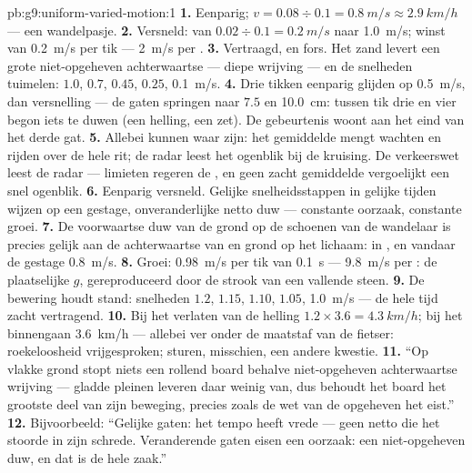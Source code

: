 \begin{solution}{pb:g9:uniform-varied-motion:1}
\textbf{1.} Eenparig; $v = 0.08 \div 0.1 = \qty{0.8}{m/s} \approx
\qty{2.9}{km/h}$ --- een wandelpasje.
\textbf{2.} Versneld: van $0.02 \div 0.1 = \qty{0.2}{m/s}$ naar
\qty{1.0}{m/s}; winst van \qty{0.2}{m/s} per tik --- \qty{2}{m/s} per
.
\textbf{3.} Vertraagd, en fors. Het zand levert een grote
niet-opgeheven achterwaartse  --- diepe wrijving --- en de
snelheden tuimelen: $1.0$, $0.7$, $0.45$, $0.25$,
\qty{0.1}{m/s}.
\textbf{4.} Drie tikken eenparig glijden op \qty{0.5}{m/s}, dan
versnelling --- de gaten springen naar $7.5$ en \qty{10.0}{cm}: tussen
tik drie en vier begon iets te duwen (een helling, een zet). De
gebeurtenis woont aan het eind van het derde gat.
\textbf{5.} Allebei kunnen waar zijn: het gemiddelde mengt wachten en
rijden over de hele rit; de radar leest het ogenblik bij de kruising. De
verkeerswet leest de radar --- limieten regeren de
, en geen zacht gemiddelde vergoelijkt een snel
ogenblik.
\textbf{6.} Eenparig versneld. Gelijke snelheidsstappen in gelijke
tijden wijzen op een gestage, onveranderlijke netto duw --- constante
oorzaak, constante groei.
\textbf{7.} De voorwaartse duw van de grond op de schoenen van de
wandelaar is precies gelijk aan de achterwaartse  van
 en grond op het lichaam: in , en vandaar de
gestage \qty{0.8}{m/s}.
\textbf{8.} Groei: \qty{0.98}{m/s} per tik van \qty{0.1}{s} ---
\qty{9.8}{m/s} per : de plaatselijke $g$, gereproduceerd door de
strook van een vallende steen.
\textbf{9.} De bewering houdt stand: snelheden $1.2$, $1.15$,
$1.10$, $1.05$, \qty{1.0}{m/s} --- de hele tijd zacht vertragend.
\textbf{10.} Bij het verlaten van de helling $1.2 \times 3.6 =
\qty{4.3}{km/h}$; bij het binnengaan \qty{3.6}{km/h} --- allebei ver
onder de maatstaf van de fietser: roekeloosheid vrijgesproken; sturen,
misschien, een andere kwestie.
\textbf{11.} ``Op vlakke grond stopt niets een rollend board behalve
niet-opgeheven achterwaartse wrijving --- gladde pleinen leveren daar
weinig van, dus behoudt het board het grootste deel van zijn beweging,
precies zoals de wet van de opgeheven  het eist.''
\textbf{12.} Bijvoorbeeld: ``Gelijke gaten: het tempo heeft vrede ---
geen netto  die het stoorde in zijn schrede. Veranderende gaten
eisen een oorzaak: een niet-opgeheven duw, en dat is de hele zaak.''
\end{solution}
